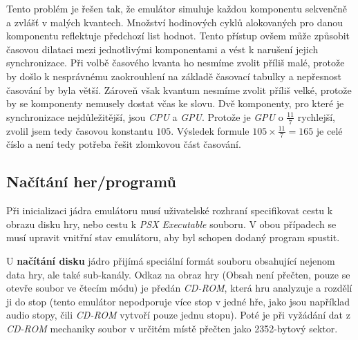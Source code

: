 Tento problém je řešen tak, že emulátor simuluje každou komponentu sekvenčně a zvlášť v malých kvantech. 
Množství hodinových cyklů alokovaných pro danou komponentu reflektuje předchozí list hodnot. 
Tento přístup ovšem může způsobit časovou dilataci mezi jednotlivými komponentami a vést k narušení jejich synchronizace. 
Při volbě časového kvanta ho nesmíme zvolit příliš malé, protože by došlo k nesprávnému zaokrouhlení na základě časovací tabulky a nepřesnost časování by byla větší. 
Zároveň však kvantum nesmíme zvolit příliš velké, protože by se komponenty nemusely dostat včas ke slovu. 
Dvě komponenty, pro které je synchronizace nejdůležitější, jsou \textit{CPU} a \textit{GPU}. 
Protože je \textit{GPU} o $\frac{11}{7}$ rychlejší, zvolil jsem tedy časovou konstantu $105$. Výsledek formule $105\times\frac{11}{7}=165$ je celé číslo a není
tedy potřeba řešit zlomkovou část časování.

\subsection{Načítání her/programů}

Při inicializaci jádra emulátoru musí uživatelské rozhraní specifikovat cestu k obrazu disku hry,
nebo cestu k \textit{PSX Executable} souboru. V obou případech se musí upravit vnitřní stav
emulátoru, aby byl schopen dodaný program spustit.

U \textbf{načítání disku} jádro přijímá speciální formát souboru obsahující nejenom data hry, ale také sub-kanály.
Odkaz na obraz hry (Obsah není přečten, pouze se otevře soubor ve čtecím módu) je předán
\textit{CD-ROM}, která hru analyzuje a rozdělí ji do stop (tento emulátor nepodporuje více stop v jedné hře, jako jsou například audio stopy, čili \textit{CD-ROM} vytvoří pouze jednu stopu).
Poté je při vyžádání dat z \textit{CD-ROM} mechaniky soubor v určitém místě přečten jako 2352-bytový sektor.

